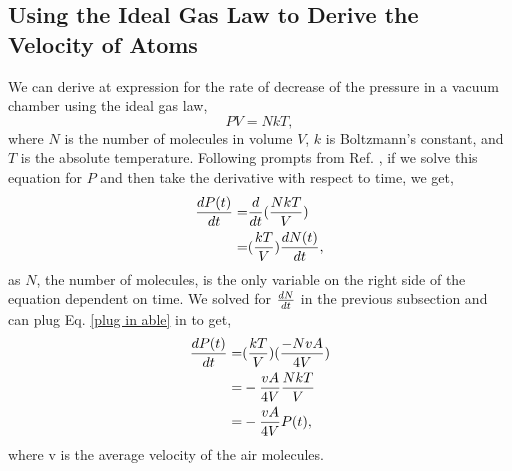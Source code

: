 \documentclass[11pt,letterpaper]{article}
\begin{document}
\subsection{Using the Ideal Gas Law to Derive the Velocity of Atoms}
We can derive at expression for the rate of decrease of the pressure in a vacuum chamber using the ideal gas law, 
\begin{equation}
    PV = NkT,
\end{equation}
where $N$ is the number of molecules in volume $V$, $k$ is Boltzmann's constant, and $T$ is the absolute temperature. Following prompts from Ref. \cite{PHYS lab}, if we solve this equation for $P$ and then take the derivative with respect to time, we get,
\begin{align}
    {d P(t) \over dt} = & {d \over dt} ({NkT \over V}) \\
    = & ({kT \over V}) {d N(t) \over dt} ,
\end{align}
as $N$, the number of molecules, is the only variable on the right side of the equation dependent on time. We solved for ${dN \over dt}$ in the previous subsection and can plug Eq. \eqref{plug in able} in to get,
\begin{align}
    {d P(t) \over dt} = & ({kT \over V}) ({-NvA \over 4V}) \\
    = & -{vA \over 4V} {NkT \over V} \\
    = & -{vA \over 4V} P(t) ,
\end{align}
where v is the average velocity of the air molecules.
\end{document}
